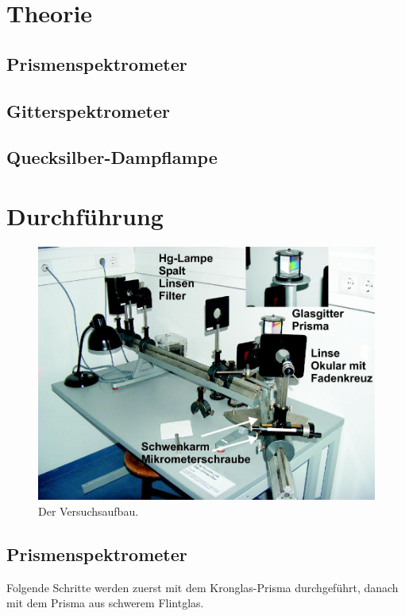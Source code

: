 \documentclass[12pt,a4paper,titlepage,headinclude,bibtotoc]{scrartcl}
\begin{document}
\section{Theorie}
\label{sec:theorie}
\subsection{Prismenspektrometer}

\subsection{Gitterspektrometer}

\subsection{Quecksilber-Dampflampe}

\section{Durchführung}
\label{sec:durchfuehrung}

\begin{figure}[!h]
	\centering
	\includegraphics[scale=0.4]{Aufbau.jpg}
	\caption{Der Versuchsaufbau. \cite[Datum: 28.12.2014]{LP19}}
	\label{fig:aufbau}
\end{figure}

\subsection{Prismenspektrometer}
Folgende Schritte werden zuerst mit dem Kronglas-Prisma durchgeführt, danach mit dem Prisma aus schwerem Flintglas.\\
\end{document}
